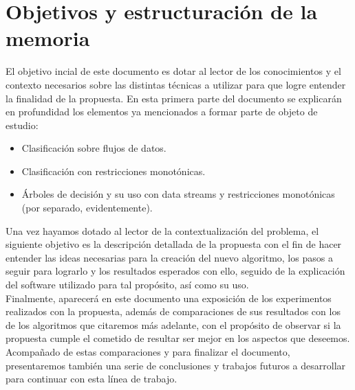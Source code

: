\section{Objetivos y estructuración de la memoria}


El objetivo incial de este documento es dotar al lector de los conocimientos y el contexto necesarios sobre las distintas técnicas a utilizar para que logre entender la finalidad de la propuesta. En esta primera parte del documento se explicarán en profundidad los elementos ya mencionados a formar parte de objeto de estudio:

\begin{itemize}
	\item Clasificación sobre flujos de datos.
	\item Clasificación con restricciones monotónicas.
	\item Árboles de decisión y su uso con data streams y restricciones monotónicas (por separado, evidentemente).
\end{itemize}


Una vez hayamos dotado al lector de la contextualización del problema, el siguiente objetivo es la descripción detallada de la propuesta con el fin de hacer entender las ideas necesarias para la creación del nuevo algoritmo, los pasos a seguir para lograrlo y los resultados esperados con ello, seguido de la explicación del software utilizado para tal propósito, así como su uso.\\

Finalmente, aparecerá en este documento una exposición de los experimentos realizados con la propuesta, además de comparaciones de sus resultados con los de los algoritmos que citaremos más adelante, con el propósito de observar si la propuesta cumple el cometido de resultar ser mejor en los aspectos que deseemos.\\
Acompañado de estas comparaciones y para finalizar el documento, presentaremos también una serie de conclusiones y trabajos futuros a desarrollar para continuar con esta línea de trabajo.

\newpage

